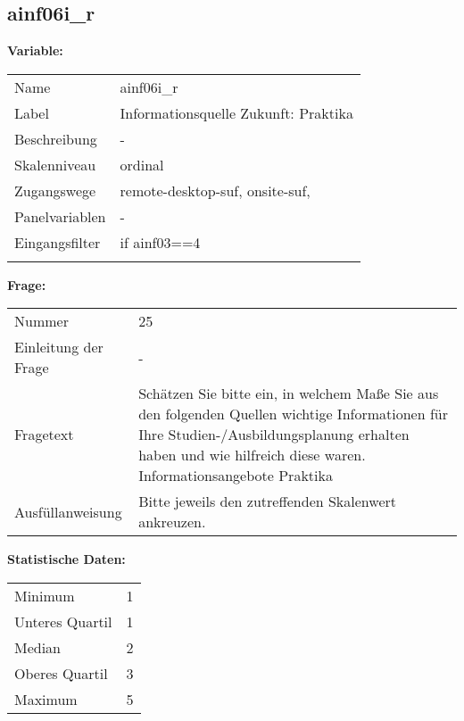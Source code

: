 	
	
	\subsection{ainf06i\_r}
	\label{subSection:ainf06i_r}

	\noindent\textbf{Variable:}\\
		\begin{tabular}{lL{11.3cm}}
			\label{tableVariable:ainf06i_r}
			Name & ainf06i\_r \\
			Label & Informationsquelle Zukunft: Praktika \\
			Beschreibung & - \\
			Skalenniveau & ordinal \\
			Zugangswege &
				remote-desktop-suf,
				onsite-suf,
 \\
			Panelvariablen & -
			 \\
			Eingangsfilter & if ainf03==4 \\
 \\
		\end{tabular}

		\vspace*{1 cm}
		\noindent\textbf{Frage:}\\
		\begin{tabular}{lL{11.3cm}}
			\label{tableQuestion:ainf06i_r}
			Nummer & 25 \\
			Einleitung der Frage & - \\
			Fragetext & Schätzen Sie bitte ein, in welchem Maße Sie aus den folgenden Quellen wichtige Informationen für Ihre Studien-/Ausbildungsplanung erhalten haben und wie hilfreich diese waren.
Informationsangebote
Praktika \\
			Ausfüllanweisung & Bitte jeweils den zutreffenden Skalenwert ankreuzen. \\
		\end{tabular}


		\vspace*{1 cm}
		\noindent\textbf{Statistische Daten:}\\
			\begin{tabular}{ll}
				\label{tableStatistics:ainf06i_r}
					Minimum & 1 \\
					Unteres Quartil & 1 \\
					Median & 2 \\
					Oberes Quartil & 3 \\
					Maximum & 5 \\
			\end{tabular}



